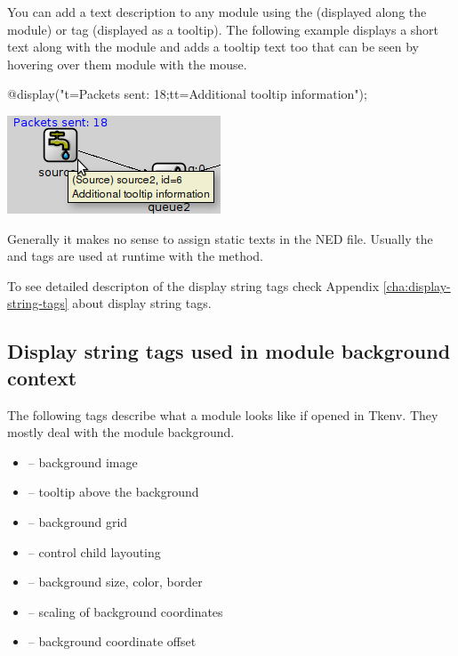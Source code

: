 You can add a text description to any module using the 
(displayed along the module) or  tag (displayed as a tooltip).
The following example displays a short text along with the module
and adds a tooltip text too that can be seen by hovering over
them module with the mouse.

\begin{ned}
@display("t=Packets sent: 18;tt=Additional tooltip information");
\end{ned}

\begin{center}
\includegraphics{figures/graphics-ttag}
\end{center}

\begin{note}
  Generally it makes no sense to assign static texts in the NED file. Usually the
   and  tags are used at runtime with the 
  method.
\end{note}

To see detailed descripton of the display string tags check
Appendix \ref{cha:display-string-tags} about display string tags.

\subsection{Display string tags used in module background context}

The following tags describe what a module looks like if opened in
Tkenv. They mostly deal with the module background.

\begin{itemize}
  \item {} -- background image
  \item {} -- tooltip above the background
  \item {} -- background grid
  \item {} -- control child layouting
  \item {} -- background size, color, border
  \item {} -- scaling of background coordinates
  \item {} -- background coordinate offset
\end{itemize}

